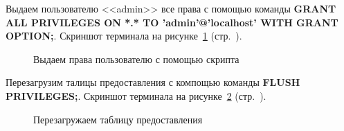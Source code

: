 Выдаем пользователю <<admin>> все права с помощью команды \sloppy \textbf{GRANT ALL PRIVILEGES ON *.* TO 'admin'@'localhost' WITH GRANT OPTION;}.
Скриншот терминала на рисунке~\ref{fig:make-phpmyadmin-superuser-step-3} (стр.~\pageref{fig:make-phpmyadmin-superuser-step-3}).

\begin{figure}[p]
    \caption{Выдаем права пользователю с помощью скрипта}
    \label{fig:make-phpmyadmin-superuser-step-3}
\end{figure}

Перезагрузим талицы предоставления с компощью команды \textbf{FLUSH PRIVILEGES;}.
Скриншот терминала на рисунке~\ref{fig:make-phpmyadmin-superuser-step-4} (стр.~\pageref{fig:make-phpmyadmin-superuser-step-4}).

\begin{figure}[p]
    \caption{Перезагружаем таблицу предоставления}
    \label{fig:make-phpmyadmin-superuser-step-4}
\end{figure}


